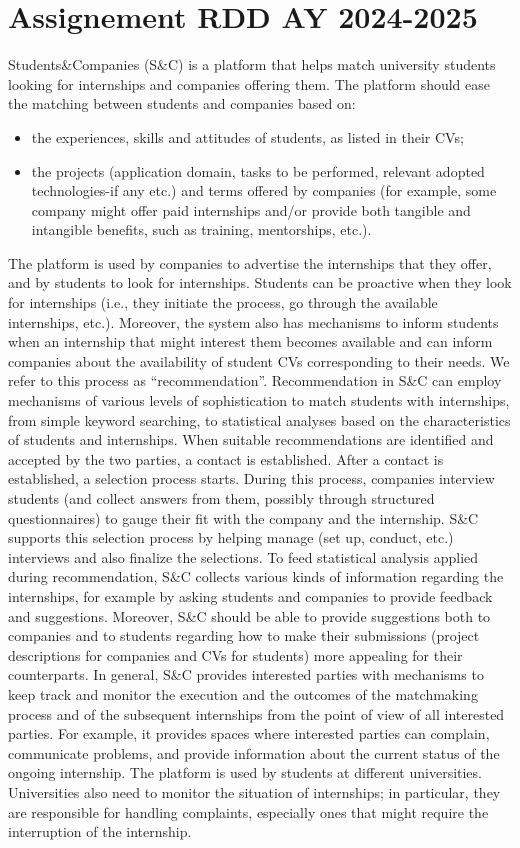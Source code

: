 \documentclass [11pt,twoside]{article}
\begin{document}
    \section{Assignement RDD AY 2024-2025}
    \label{appendix:assignement}
    Students\&Companies (S\&C) is a platform that helps match university students looking for internships
    and companies offering them. The platform should ease the matching between students and
    companies based on:
    \begin{itemize}
        \item the experiences, skills and attitudes of students, as listed in their CVs;
        \item the projects (application domain, tasks to be performed, relevant adopted technologies-if any etc.) and terms offered by companies (for example, some company might offer paid internships and/or provide both tangible and intangible benefits, such as training, mentorships, etc.).
    \end{itemize}
The platform is used by companies to advertise the internships that they offer, and by students to look
for internships. Students can be proactive when they look for internships (i.e., they initiate the process,
go through the available internships, etc.). Moreover, the system also has mechanisms to inform
students when an internship that might interest them becomes available and can inform companies
about the availability of student CVs corresponding to their needs. We refer to this process as
“recommendation”.
Recommendation in S\&C can employ mechanisms of various levels of sophistication to match students
with internships, from simple keyword searching, to statistical analyses based on the characteristics of
students and internships.
When suitable recommendations are identified and accepted by the two parties, a contact is
established. After a contact is established, a selection process starts. During this process, companies
interview students (and collect answers from them, possibly through structured questionnaires) to
gauge their fit with the company and the internship. S\&C supports this selection process by helping
manage (set up, conduct, etc.) interviews and also finalize the selections.
To feed statistical analysis applied during recommendation, S\&C collects various kinds of information
regarding the internships, for example by asking students and companies to provide feedback and
suggestions.
Moreover, S\&C should be able to provide suggestions both to companies and to students regarding
how to make their submissions (project descriptions for companies and CVs for students) more
appealing for their counterparts.
In general, S\&C provides interested parties with mechanisms to keep track and monitor the execution
and the outcomes of the matchmaking process and of the subsequent internships from the point of
view of all interested parties. For example, it provides spaces where interested parties can complain,
communicate problems, and provide information about the current status of the ongoing internship.
The platform is used by students at different universities. Universities also need to monitor the situation
of internships; in particular, they are responsible for handling complaints, especially ones that might
require the interruption of the internship.
    
\end{document}
